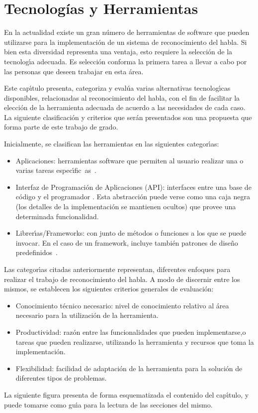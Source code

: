 \chapter{Tecnolog\'ias y Herramientas}
\label{sec:tecnologias}

En la actualidad existe un gran n\'umero de herramientas de software que pueden utilizarse para la implementaci\'on de un
sistema de reconocimiento del habla. Si bien esta diversidad representa una ventaja, esto requiere
la selecci\'on de la tecnolog{\'\i}a adecuada. Es selecci\'on conforma la primera tarea a llevar a
cabo por las personas que deseen trabajar en esta \'area.

Este cap{\'\i}tulo presenta, categoriza y eval\'ua varias alternativas tecnolog{\'\i}cas disponibles, relacionadas
al reconocimiento del habla, con el fin de facilitar la elecci\'on de la herramienta adecuada
de acuerdo a las necesidades de cada caso. La siguiente clasificaci\'on y criterios que ser\'an presentados son
una propuesta que forma parte de este trabajo de grado.

Inicialmente, se clasifican las herramientas en las siguientes categor{\'\i}as:
\begin{itemize}
	\item Aplicaciones: herramientas software que permiten al usuario realizar una o
	varias tareas \mbox{espec{\'\i}fic as \cite{GoodwillComputer}}.
	\item Interfaz de Programaci\'on de  Aplicaciones (API): interfaces entre una base de c\'odigo y
	el programador \cite{DoucetteOnApi}. Esta abstracci\'on puede verse como una caja negra
	(los detalles de la implementaci\'on se mantienen ocultos) que provee una determinada funcionalidad.
	\item Librer{\'\i}as/Frameworks: con junto de m\'etodos o funciones a los que se puede invocar.
	En el caso de un framework, incluye tambi\'en patrones de dise\~no
	\mbox{predefinidos \cite{FowlerInversion}}.
\end{itemize}

Las categor{\'\i}as citadas anteriormente representan, diferentes enfoques para realizar el trabajo
de reconocimiento del habla. A modo de discernir entre los mismos, se establecen
los siguientes criterios generales de evaluaci\'on:
\begin{itemize}
	\item Conocimiento t\'ecnico necesario: nivel de conocimiento relativo al \'area necesario para la
	utilizaci\'on de la herramienta. 
	\item Productividad: raz\'on entre las funcionalidades que pueden implementarse,o tareas que pueden
	realizarse, utilizando la herramienta y recursos que toma la implementaci\'on.
	\item Flexibilidad: facilidad de adaptaci\'on de la herramienta para la soluci\'on de diferentes
	tipos de problemas.
\end{itemize}

La siguiente figura presenta de forma esquematizada el contenido del cap{\'\i}tulo, y puede tomarse como
gu{\'\i}a para la lectura de las secciones del mismo.




